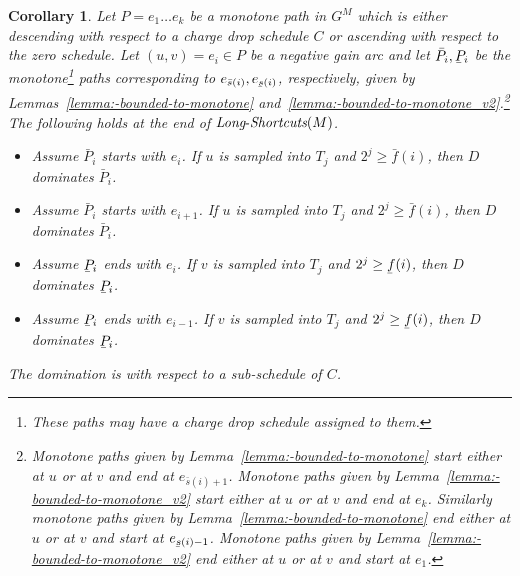 \documentclass[11pt]{article}
\newtheorem{corollary}[theorem]{Corollary}
\newcommand{\ubar}[1]{\underaccent{\bar}{{#1}}}
\newcommand{\LS}{\mbox{{\it Long}-{\it Shortcuts}}}
\begin{document}
\begin{corollary}\label{corollary:long-shortcuts}
    Let $P= e_1 \ldots e_k$ be a monotone path in $G^M$ which is either descending with respect to a charge drop schedule $C$ or ascending with respect to the zero schedule. Let $(u,v)=e_i\in P$ be a negative gain arc and let $\bar{P}_i,\ubar{P}_i$ be the monotone\footnote{These paths may have a charge drop schedule assigned to them.} paths corresponding to $e_{\bar{s}(i)},e_{\ubar{s}(i)}$, respectively, given by Lemmas~\ref{lemma:-bounded-to-monotone} and~\ref{lemma:-bounded-to-monotone_v2}.\footnote{Monotone paths given by Lemma~\ref{lemma:-bounded-to-monotone} start either at $u$ or at $v$ and end at $e_{\bar{s}(i)+1}$. Monotone paths given by Lemma~\ref{lemma:-bounded-to-monotone_v2} start either at $u$ or at $v$ and end at $e_k$. Similarly monotone paths given by Lemma~\ref{lemma:-bounded-to-monotone} end either at $u$ or at $v$ and start at $e_{\ubar{s}(i)-1}$. Monotone paths given by Lemma~\ref{lemma:-bounded-to-monotone_v2} end either at $u$ or at $v$ and start at $e_1$.} The following holds at the end of $\LS(M)$.
    \begin{itemize}
        \item Assume $\bar{P}_i$ starts with $e_i$. If $u$ is sampled into $T_j$ and $2^j\ge \bar{f}(i)$, then $D$ dominates $\bar{P}_i$.
        \item Assume $\bar{P}_i$ starts with $e_{i+1}$. If $u$ is sampled into $T_j$ and $2^j\ge \bar{f}(i)$, then $D$ dominates $\bar{P}_i$.
        \item Assume $\ubar{P}_i$ ends with $e_i$. If $v$ is sampled into $T_j$ and $2^j\ge \ubar{f}(i)$, then $D$ dominates $\ubar{P}_i$.
        \item Assume $\ubar{P}_i$ ends with $e_{i-1}$. If $v$ is sampled into $T_j$ and $2^j\ge \ubar{f}(i)$, then $D$ dominates $\ubar{P}_i$.
    \end{itemize}
    The domination is with respect to a sub-schedule of $C$.
\end{corollary}
\end{document}
